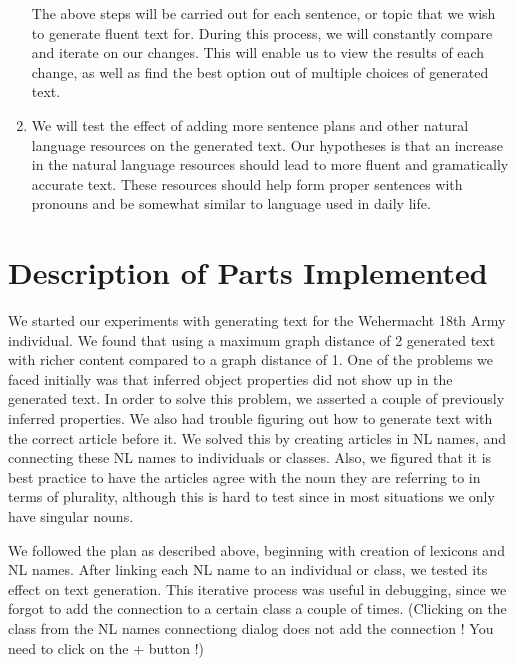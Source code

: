 \documentclass[12pt, letterpaper]{article}
\begin{document}
\begin{enumerate}
      The above steps will be carried out for each sentence, or topic that we wish to generate fluent text for.
      During this process, we will constantly compare and iterate on our changes.
      This will enable us to view the results of each change, as well as find the best option out of multiple choices
      of generated text.

  		\item
      We will test the effect of adding more sentence plans and other natural language resources on the generated text.
      Our hypotheses is that an increase in the natural language resources should lead to more fluent and gramatically
      accurate text.    
      These resources should help form proper sentences with pronouns and be somewhat similar to language used in 
      daily life.
  		
  	
  	\end{enumerate}
  
  \pagebreak

  \section*{Description of Parts Implemented}

    We started our experiments with generating text for the Wehermacht 18th Army individual. 
    We found that using a maximum graph distance of 2 generated text with richer content compared to a graph distance of 1.
    One of the problems we faced initially was that inferred object properties did not show up in the generated text. 
    In order to solve this problem, we asserted a couple of previously inferred properties.
    We also had trouble figuring out how to generate text with the correct article before it. 
    We solved this by creating articles in NL names, and connecting these NL names to individuals or classes.
    Also, we figured that it is best practice to have the articles agree with the noun they are referring to in terms of
    plurality, although this is hard to test since in most situations we only have singular nouns.

    \vspace{4mm}

    \noindent
    We followed the plan as described above, beginning with creation of lexicons and NL names.
    After linking each NL name to an individual or class, we tested its effect on text generation.
    This iterative process was useful in debugging, since we forgot to add the connection to a certain class a couple of
    times. (Clicking on the class from the NL names connectiong dialog does not add the connection ! You need to click 
    on the + button !)
\end{document}
